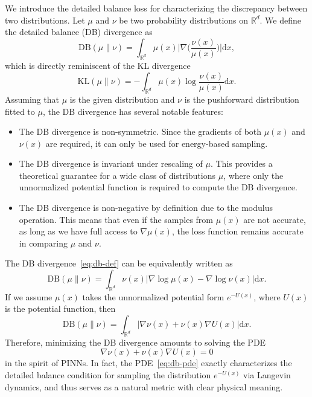 \documentclass{article}
\newcommand{\D}{\mathrm{d}}
\newcommand{\DB}{\mathrm{DB}}
\newcommand{\KL}{\mathrm{KL}}
\theoremstyle{plain}
\begin{document}
We introduce the detailed balance loss for characterizing the discrepancy between two distributions. Let $\mu$ and $\nu$ be two probability distributions on $\mathbb R^d$. We define the detailed balance (DB) divergence as
\begin{equation}\label{eq:db-def}
    \DB(\mu\|\nu) = \int_{\mathbb R^d} \mu(x) \biggl|\nabla\biggl(\frac{\nu(x)}{\mu(x)}\biggr)\biggr| \D x,
\end{equation}
which is directly reminiscent of the KL divergence
\begin{equation*}
    \KL(\mu\|\nu) = -\int_{\mathbb R^d} \mu(x) \log \frac{\nu(x)}{\mu(x)} \D x.
\end{equation*}
Assuming that $\mu$ is the given distribution and $\nu$ is the pushforward distribution fitted to $\mu$, the DB divergence has several notable features:
\begin{itemize}
    \item The DB divergence is non-symmetric. Since the gradients of both $\mu(x)$ and $\nu(x)$ are required, it can only be used for energy-based sampling.
    \item The DB divergence is invariant under rescaling of $\mu$. This provides a theoretical guarantee for a wide class of distributions $\mu$, where only the unnormalized potential function is required to compute the DB divergence.
    \item The DB divergence is non-negative by definition due to the modulus operation. This means that even if the samples from $\mu(x)$ are not accurate, as long as we have full access to $\nabla \mu(x)$, the loss function remains accurate in comparing $\mu$ and $\nu$.
\end{itemize}

The DB divergence~\eqref{eq:db-def} can be equivalently written as
\begin{equation}\label{eq:db-score}
    \DB(\mu \| \nu) = \int_{\mathbb R^d} \nu(x) \bigl|\nabla \log \mu(x) - \nabla \log \nu(x) \bigr| \D x.
\end{equation}
If we assume $\mu(x)$ takes the unnormalized potential form $e^{-U(x)}$, where $U(x)$ is the potential function, then
\begin{equation*}
    \DB(\mu \| \nu) = \int_{\mathbb R^d} \bigl|\nabla \nu(x) + \nu(x)\nabla U(x) \bigr| \D x.
\end{equation*}
Therefore, minimizing the DB divergence amounts to solving the PDE
\begin{equation}\label{eq:db-pde}
    \nabla \nu(x) + \nu(x) \nabla U(x) = 0
\end{equation}
in the spirit of PINNs. In fact, the PDE~\eqref{eq:db-pde} exactly characterizes the detailed balance condition for sampling the distribution $e^{-U(x)}$ via Langevin dynamics, and thus serves as a natural metric with clear physical meaning.
\end{document}

